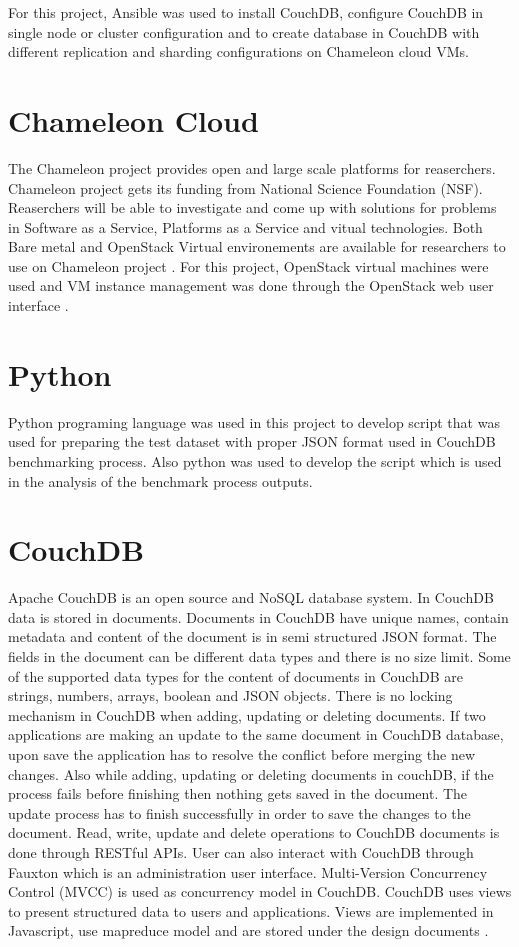 For this project, Ansible was used to install CouchDB, configure
CouchDB in single node or cluster configuration and to create database
in CouchDB with different replication and sharding configurations on
Chameleon cloud VMs. 

\section{Chameleon Cloud}
The Chameleon project provides open and large scale platforms for
reaserchers. Chameleon project gets its funding from National Science
Foundation (NSF). Reaserchers will be able to investigate and come up
with solutions for problems in Software as a Service, Platforms as a
Service and vitual technologies. Both Bare metal and OpenStack Virtual
environements are available for researchers to use on Chameleon
project \cite{www-Chameleon}. For this project, OpenStack virtual
machines were used and VM instance management was done through the
OpenStack web user interface \cite{www-ChameleonDoc}. 

\section{Python}
Python programing language was used in this project to develop script
that was used for  preparing the test dataset with proper JSON format
used in CouchDB benchmarking process. Also python was used to develop
the script which is used in the analysis of the benchmark process outputs.

\section{CouchDB}
Apache CouchDB is an open source and NoSQL database system. In CouchDB
data is stored in documents. Documents in CouchDB have unique names, contain
metadata and content of the document is in semi structured JSON format. The fields in
the document can be different data types and there is no size
limit. Some of the supported data types for the content of documents
in CouchDB are strings, numbers, arrays, boolean and JSON
objects. There is no locking mechanism in CouchDB when adding,
updating or deleting documents. If two applications are making an
update to the same document in CouchDB database, upon save the
application has to resolve the conflict before merging the new
changes. Also while adding, updating or deleting documents in couchDB,
if the process fails before finishing then nothing gets saved in the
document. The update process has to finish successfully in order to
save the changes to the document. Read, write, update and delete
operations to CouchDB documents is done through RESTful
APIs. User can also interact with CouchDB through Fauxton which is
an administration user interface. Multi-Version Concurrency Control
(MVCC) is used as concurrency model in CouchDB. CouchDB uses views to
present structured data to users and applications. Views are
implemented in Javascript, use mapreduce model and are stored under
the design documents \cite{www-Couchdb}. 

